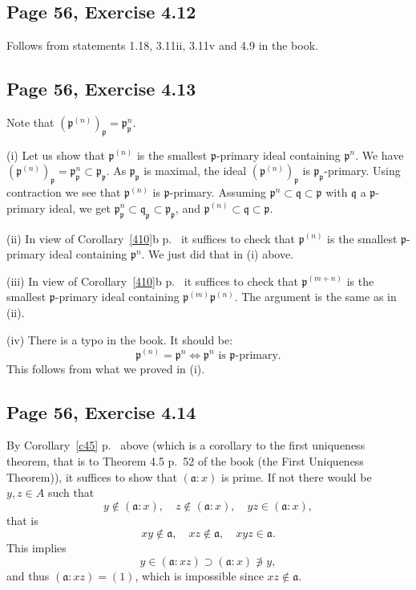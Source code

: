 \documentclass[parskip=half,fontsize=12pt]{scrartcl}%
\newcommand{\mf}{\mathfrak}
\newcommand{\aaa}{\mf a}
\newcommand{\ppp}{\mf p}
\newcommand{\qqq}{\mf q}
\begin{document}
\subsection{Page 56, Exercise 4.12}%

Follows from statements 1.18, 3.11ii, 3.11v and 4.9 in the book.

\subsection{Page 56, Exercise 4.13}%

Note that $(\ppp^{(n)})_\ppp=\ppp_\ppp^n$.

(i) Let us show that $\ppp^{(n)}$ is the smallest $\ppp$-primary ideal containing $\ppp^n$. We have $(\ppp^{(n)})_\ppp=\ppp_\ppp^n\subset\ppp_\ppp$. As $\ppp_\ppp$ is maximal, the ideal $(\ppp^{(n)})_\ppp$ is $\ppp_\ppp$-primary. Using contraction we see that $\ppp^{(n)}$ is $\ppp$-primary. Assuming $\ppp^n\subset\qqq\subset\ppp$ with $\qqq$ a $\ppp$-primary ideal, we get $\ppp_\ppp^n\subset\qqq_\ppp\subset\ppp_\ppp$, and $\ppp^{(n)}\subset\qqq\subset\ppp$. %

(ii) In view of Corollary~\ref{410}b p.~\pageref{410} it suffices to check that $\ppp^{(n)}$ is the smallest $\ppp$-primary ideal containing $\ppp^n$. We just did that in (i) above.

(iii) In view of Corollary~\ref{410}b p.~\pageref{410} it suffices to check that $\ppp^{(m+n)}$ is the smallest $\ppp$-primary ideal containing $\ppp^{(m)}\ppp^{(n)}$. The argument is the same as in (ii).

(iv) There is a typo in the book. It should be: 
$$
\ppp^{(n)}=\ppp^n\iff\ppp^n\text{ is }\ppp\text{-primary.}
$$ 
This follows from what we proved in (i).

\subsection{Page 56, Exercise 4.14}%

By Corollary~\ref{c45} p.~\pageref{c45} above (which is a corollary to the first uniqueness theorem, that is to Theorem 4.5 p.~52 of the book (the First Uniqueness Theorem)), it suffices to show that $(\aaa:x)$ is prime. If not there would be $y,z\in A$ such that 
$$
y\notin(\aaa:x),\quad z\notin(\aaa:x),\quad yz\in(\aaa:x),
$$ 
that is 
$$
xy\notin\aaa,\quad xz\notin\aaa,\quad xyz\in\aaa.
$$ 
This implies 
$$
y\in(\aaa:xz)\supset(\aaa:x)\not\ni y,
$$ 
and thus $(\aaa:xz)=(1)$, which is impossible since $xz\notin\aaa$.
\end{document}
